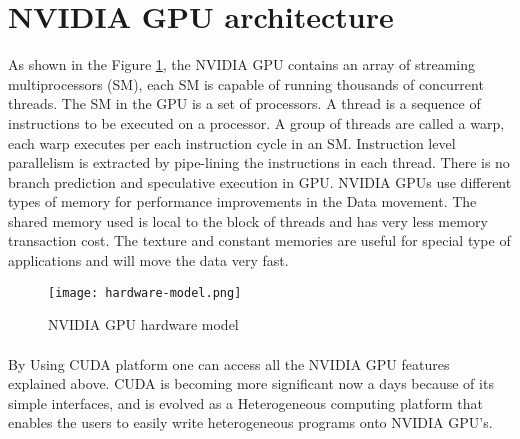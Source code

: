 \section{NVIDIA GPU architecture}
As shown in the Figure \ref{Figure:1.3}, the NVIDIA GPU contains an array of streaming multiprocessors (SM), each SM is capable of running thousands of concurrent threads. The SM in the GPU is a set of processors. A thread is a sequence of instructions to be executed on a processor. A group of threads are called a warp, each warp executes per each instruction cycle in an SM. Instruction level parallelism is extracted by pipe-lining the instructions in each thread. There is no branch prediction and speculative execution in GPU. NVIDIA GPUs use different types of memory for performance improvements in the Data movement. The shared memory used is local to the block of threads and has very less memory transaction cost. The texture and constant memories are useful for special type of applications and will move the data very fast.
\begin{figure}[htb]
	\centering
	\texttt{[image: hardware-model.png]}
	\caption{NVIDIA GPU hardware model}
	\label{Figure:1.3}
\end{figure}
\paragraph*{}By Using CUDA platform one can access all the NVIDIA GPU features explained above. CUDA is becoming more significant now a days because of its simple interfaces, and is evolved as a Heterogeneous computing platform that enables the users to easily write heterogeneous programs onto NVIDIA GPU’s.